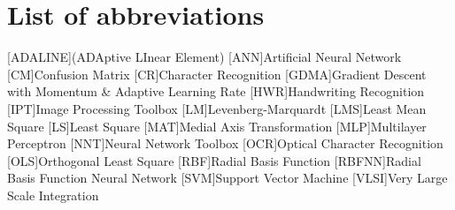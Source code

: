 
 \noindent


\chapter*{List of abbreviations}

\begin{acronym}
        [ADALINE]{(ADAptive LInear Element)}
        [ANN]{Artificial Neural Network}
        [CM]{Confusion Matrix}
        [CR]{Character Recognition}
        [GDMA]{Gradient Descent with Momentum \& Adaptive Learning Rate}
        [HWR]{Handwriting Recognition}
        [IPT]{Image Processing Toolbox}
        [LM]{Levenberg-Marquardt}
        [LMS]{Least Mean Square}
        [LS]{Least Square}
        [MAT]{Medial Axis Transformation}
        [MLP]{Multilayer Perceptron}
        [NNT]{Neural Network Toolbox}
        [OCR]{Optical Character Recognition}
        [OLS]{Orthogonal Least Square}
        [RBF]{Radial Basis Function}
        [RBFNN]{Radial Basis Function Neural Network}
        [SVM]{Support Vector Machine}
        [VLSI]{Very Large Scale Integration}
\end{acronym}
